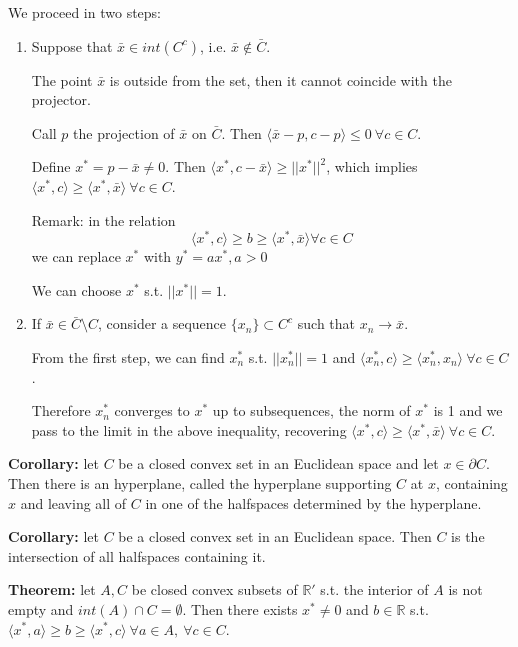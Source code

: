 \noindent We proceed in two steps:
\begin{enumerate}
	\item Suppose that $\bar{x} \in int(C^c)$, i.e. $\bar{x} \notin \bar{C}$.

	\noindent The point $\bar{x}$ is outside from the set, then it cannot 
	coincide with the projector.

	\noindent Call $p$ the projection of $\bar{x}$ on $\bar{C}$. Then 
	$\langle \bar{x}-p, c-p\rangle \leq 0 ~\forall c \in C$.

	\noindent Define $x^* = p - \bar{x} \neq 0$. Then 
	$\langle x^*, c-\bar{x}\rangle \geq ||x^*||^2$, which implies 
	$\langle x^*,c \rangle \geq \langle x^*,\bar{x} \rangle ~\forall c \in C$.

	\noindent Remark: in the relation 
	\[
		\langle x^*,c \rangle \geq b \geq \langle x^*, \bar{x} \rangle 
		\forall c \in C
	\]
	we can replace $x^*$ with $y^* = ax^*, a > 0$

	\noindent We can choose $x^*$ s.t. $||x^*|| = 1$.

	\item If $\bar{x} \in \bar{C} \setminus C$, consider a sequence $\{x_n\}
	\subset C^c$ such that $x_n \rightarrow \bar{x}$.

	\noindent From the first step, we can find $x^*_n$ s.t. $||x^*_n|| = 1$ 
	and $\langle x^*_n,c \rangle \geq \langle x^*_n,x_n \rangle ~\forall c \in 
	C$.

	\noindent Therefore $x_n^*$ converges to $x^*$ up to subsequences, the norm 
	of $x^*$ is 1 and we pass to the limit in the above inequality, recovering 
	$\langle x^*,c \rangle \geq \langle x^*,\bar{x} \rangle ~\forall c \in C$.
\end{enumerate}

\bigskip
\noindent \textbf{Corollary:} let $C$ be a closed convex set in an Euclidean 
space and let $x \in \partial C$. Then there is an hyperplane, called the 
hyperplane supporting $C$ at $x$, containing $x$ and leaving all of $C$ in one 
of the halfspaces determined by the hyperplane.

\bigskip
\noindent \textbf{Corollary:} let $C$ be a closed convex set in an Euclidean 
space. Then $C$ is the intersection of all halfspaces containing it.

\bigskip
\noindent \textbf{Theorem:} let $A, C$ be closed convex subsets of $\mathbb{R}'$ 
s.t. the interior of $A$ is not empty and $int(A) \cap C = \emptyset$. Then 
there exists $x^* \neq 0$ and $b \in \mathbb{R}$ s.t. 
$\langle x^*,a \rangle \geq b \geq \langle x^*,c \rangle ~\forall a \in A, 
~\forall c \in C$.

